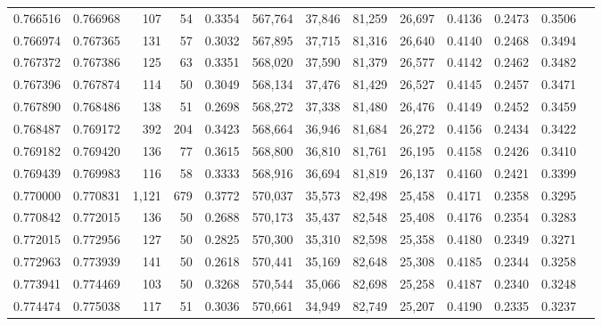 \begin{tabular}{rrrrrrrrrrrrr}
0.766516 & 0.766968 &   107 &  54 &                                     0.3354 & 567,764 &  37,846 &  81,259 &  26,697 & 0.4136 & 0.2473 & 0.3506 \\
0.766974 & 0.767365 &   131 &  57 &                                     0.3032 & 567,895 &  37,715 &  81,316 &  26,640 & 0.4140 & 0.2468 & 0.3494 \\
0.767372 & 0.767386 &   125 &  63 &                                     0.3351 & 568,020 &  37,590 &  81,379 &  26,577 & 0.4142 & 0.2462 & 0.3482 \\
0.767396 & 0.767874 &   114 &  50 &                                     0.3049 & 568,134 &  37,476 &  81,429 &  26,527 & 0.4145 & 0.2457 & 0.3471 \\
0.767890 & 0.768486 &   138 &  51 &                                     0.2698 & 568,272 &  37,338 &  81,480 &  26,476 & 0.4149 & 0.2452 & 0.3459 \\
0.768487 & 0.769172 &   392 & 204 &                                     0.3423 & 568,664 &  36,946 &  81,684 &  26,272 & 0.4156 & 0.2434 & 0.3422 \\
0.769182 & 0.769420 &   136 &  77 &                                     0.3615 & 568,800 &  36,810 &  81,761 &  26,195 & 0.4158 & 0.2426 & 0.3410 \\
0.769439 & 0.769983 &   116 &  58 &                                     0.3333 & 568,916 &  36,694 &  81,819 &  26,137 & 0.4160 & 0.2421 & 0.3399 \\
0.770000 & 0.770831 & 1,121 & 679 &                                     0.3772 & 570,037 &  35,573 &  82,498 &  25,458 & 0.4171 & 0.2358 & 0.3295 \\
0.770842 & 0.772015 &   136 &  50 &                                     0.2688 & 570,173 &  35,437 &  82,548 &  25,408 & 0.4176 & 0.2354 & 0.3283 \\
0.772015 & 0.772956 &   127 &  50 &                                     0.2825 & 570,300 &  35,310 &  82,598 &  25,358 & 0.4180 & 0.2349 & 0.3271 \\
0.772963 & 0.773939 &   141 &  50 &                                     0.2618 & 570,441 &  35,169 &  82,648 &  25,308 & 0.4185 & 0.2344 & 0.3258 \\
0.773941 & 0.774469 &   103 &  50 &                                     0.3268 & 570,544 &  35,066 &  82,698 &  25,258 & 0.4187 & 0.2340 & 0.3248 \\
0.774474 & 0.775038 &   117 &  51 &                                     0.3036 & 570,661 &  34,949 &  82,749 &  25,207 & 0.4190 & 0.2335 & 0.3237 \\

\end{tabular}
